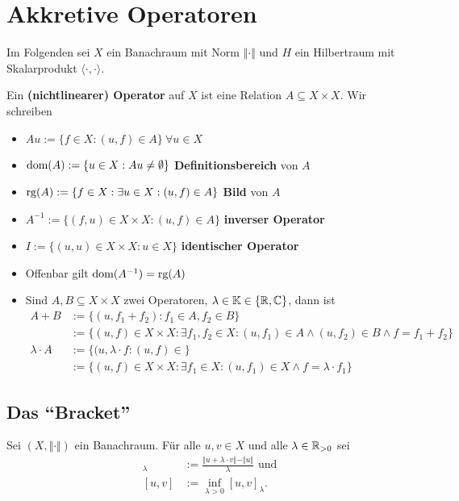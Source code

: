
\chapter{Akkretive Operatoren}
Im Folgenden sei $X$ ein Banachraum mit Norm $\Vert\cdot\Vert$ und $H$ ein Hilbertraum mit Skalarprodukt $\langle\cdot,\cdot\rangle$.

\begin{definition}
Ein \textbf{(nichtlinearer) Operator} auf $X$ ist eine Relation $A\subseteq X\times X$. Wir schreiben
\begin{itemize}
\item $Au:=\lbrace f\in X:(u,f)\in A\rbrace~\forall u\in X$
\item $\text{dom}(A):=\lbrace u\in X:Au\neq\emptyset\rbrace$ \textbf{Definitionsbereich} von $A$
\item $\text{rg}(A):=\lbrace f\in X:\exists u\in X:(u,f)\in A\rbrace$ \textbf{Bild} von $A$
\item $A^{-1}:=\lbrace (f,u)\in X\times X:(u,f)\in A\rbrace$ \textbf{inverser Operator}
\item $I:=\lbrace(u,u)\in X\times X:u\in X\rbrace$ \textbf{identischer Operator}
\item Offenbar gilt $\text{dom}(A^{-1})=\text{rg}(A)$
\item Sind $A,B\subseteq X\times X$ zwei Operatoren, $\lambda\in\mathbb{K}\in\lbrace\mathbb{R},\mathbb{C}\rbrace$, dann ist
\begin{align*}
A+B&:=\lbrace(u,f_1+f_2):f_1\in A,f_2\in B\rbrace\\
&:=\lbrace(u,f)\in X\times X:\exists f_1,f_2\in X:(u,f_1)\in A\wedge(u,f_2)\in B\wedge f=f_1+f_2\rbrace\\
\lambda\cdot A&:=\lbrace(u,\lambda\cdot f:(u,f)\in \rbrace\\
&:=\lbrace(u,f)\in X\times X:\exists f_1\in X:(u,f_1)\in X\wedge f=\lambda\cdot f_1\rbrace
\end{align*}
\end{itemize}
\end{definition}

\section{Das ``Bracket''}
Sei $(X,\Vert\cdot\Vert)$ ein Banachraum. Für alle $u,v\in X$ und alle $\lambda\in\mathbb{R}_{>0}$ sei
\begin{align*}
[u,v]_\lambda&:=\frac{\Vert u+\lambda\cdot v\Vert-\Vert u\Vert}{\lambda}\text{ und}\\
[u,v]&:=\inf\limits_{\lambda>0}[u,v]_\lambda.
\end{align*}

